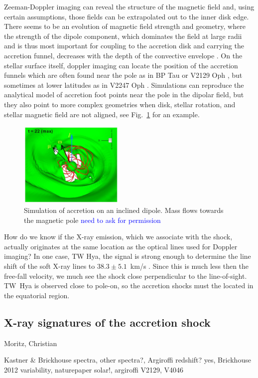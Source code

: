 Zeeman-Doppler imaging can reveal the structure of the magnetic field and, using certain assumptions, those fields can be extrapolated out to the inner disk edge. There seems to be an evolution of magnetic field strength and geometry, where the strength of the dipole component, which dominates the field at large radii and is thus most important for coupling to the accretion disk and carrying the accretion funnel, decreases with the depth of the convective envelope \cite{2012ApJ...755...97G,2019A&A...622A..72V}. On the stellar surface itself, doppler imaging can locate the position of the accretion funnels which are often found near the pole as in BP Tau \cite{2008MNRAS.386.1234D} or V2129 Oph \cite{2011A&A...530A...1A}, but sometimes at lower latitudes as in V2247 Oph \cite{2010MNRAS.402.1426D}. Simulations can reproduce the analytical model of accretion foot points near the pole in the dipolar field, but they also point to more complex geometries when disk, stellar rotation, and stellar magnetic field are not aligned, see Fig.~\ref{fig:romanova} for an example.

\begin{figure}[t]
\centering
\includegraphics[width=5cm]{figs/Romanova2021fig8-panel.png}
\caption{Simulation of accretion on an inclined dipole. Mass flows towards the magnetic pole \cite{2021MNRAS.506..372R} \textcolor{blue}{need to ask for permission} \label{fig:romanova}}
\end{figure}

How do we know if the X-ray emission, which we associate with the shock, actually originates at the same location as the optical lines used for Doppler imaging? In one case, TW Hya, the signal is strong enough to determine the line shift of the soft X-ray lines to $38.3 \pm 5.1$~km/s \cite{2017A&A...607A..14A}. Since this is much less then the free-fall velocity, we much see the shock close perpendicular to the line-of-sight. TW~Hya is observed close to pole-on, so the accretion shocks must the located in the equatorial region.




\subsection{X-ray signatures of the accretion shock}
\label{sect:accretionobs}
{\color{blue}Moritz, Christian

Kastner & Brickhouse spectra, other spectra?, Argiroffi redshift? yes, Brickhouse 2012 variability,  naturepaper solar!, argiroffi V2129, V4046}


